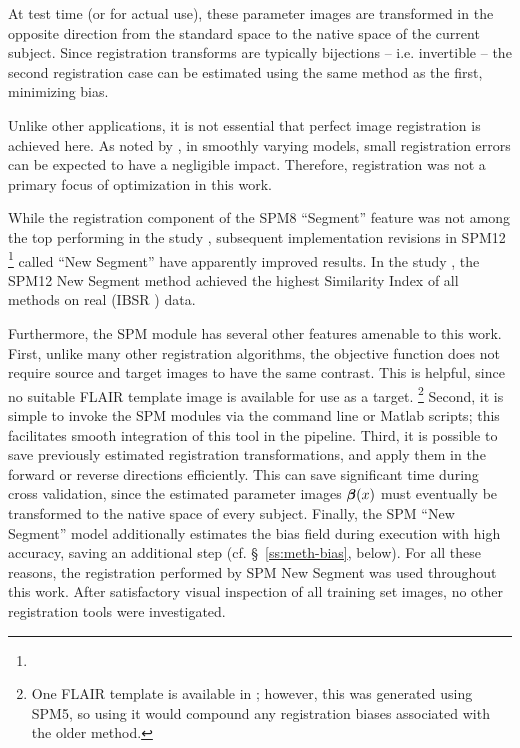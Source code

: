 At test time (or for actual use), these parameter images are transformed in the opposite direction from the standard space to the native space of the current subject.
Since registration transforms are typically bijections -- i.e. invertible -- the second registration case can be estimated using the same method as the first, minimizing bias.
\par
Unlike other applications, it is not essential that perfect image registration is achieved here.
As noted by \citeauthor{Harmouche2015} \cite{Harmouche2015}, in smoothly varying models, small registration errors can be expected to have a negligible impact.
Therefore, registration was not a primary focus of optimization in this work.
\par
While the registration component of the SPM8 ``Segment'' feature \cite{Ashburner2005} was not among the top performing in the \citeyear{Klein2009} study \cite{Klein2009}, subsequent implementation revisions in SPM12%
\footnote{}
called ``New Segment'' have apparently improved results.
In the \citeyear{Kazemi2014} study \cite{Kazemi2014}, the SPM12 New Segment method achieved the highest Similarity Index of all methods on real (IBSR \cite{IBSR}) data.
\par
Furthermore, the SPM module has several other features amenable to this work.
First, unlike many other registration algorithms, the objective function does not require source and target images to have the same contrast.
This is helpful, since no suitable FLAIR template image is available for use as a target.%
\footnote{One FLAIR template is available in \cite{Winkler2012}; however, this was generated using SPM5, so using it would compound any registration biases associated with the older method.}
Second, it is simple to invoke the SPM modules via the command line or Matlab scripts;
this facilitates smooth integration of this tool in the pipeline.
Third, it is possible to save previously estimated registration transformations, and apply them in the forward or reverse directions efficiently.
This can save significant time during cross validation, since the estimated parameter images $\bm{\beta}(x)$ must eventually be transformed to the native space of every subject.
Finally, the SPM ``New Segment'' model additionally estimates the bias field during execution with high accuracy, saving an additional step (cf. \S\ \ref{ss:meth-bias}, below). 
For all these reasons, the registration performed by SPM New Segment was used throughout this work.
After satisfactory visual inspection of all training set images, no other registration tools were investigated.
